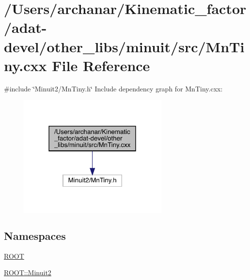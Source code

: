 \hypertarget{adat-devel_2other__libs_2minuit_2src_2MnTiny_8cxx}{}\section{/\+Users/archanar/\+Kinematic\+\_\+factor/adat-\/devel/other\+\_\+libs/minuit/src/\+Mn\+Tiny.cxx File Reference}
\label{adat-devel_2other__libs_2minuit_2src_2MnTiny_8cxx}
{\ttfamily \#include \char`\"{}Minuit2/\+Mn\+Tiny.\+h\char`\"{}}\newline
Include dependency graph for Mn\+Tiny.\+cxx\+:
\nopagebreak
\begin{figure}[H]
\begin{center}
\leavevmode
\includegraphics[width=214pt]{d3/d4a/adat-devel_2other__libs_2minuit_2src_2MnTiny_8cxx__incl}
\end{center}
\end{figure}
\subsection*{Namespaces}
\begin{DoxyCompactItemize}
\item 
 \mbox{\hyperlink{namespaceROOT}{R\+O\+OT}}
\item 
 \mbox{\hyperlink{namespaceROOT_1_1Minuit2}{R\+O\+O\+T\+::\+Minuit2}}
\end{DoxyCompactItemize}
